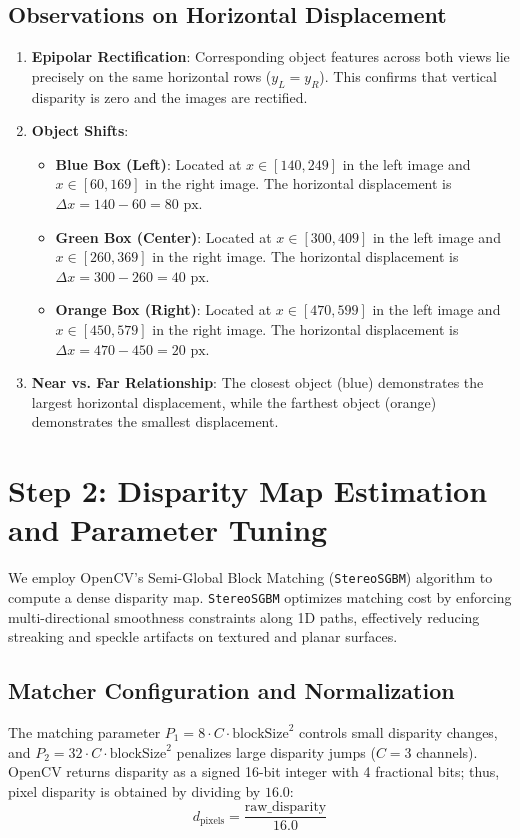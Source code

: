 \documentclass[12pt]{article}
\begin{document}
\subsection{Observations on Horizontal Displacement}
\begin{enumerate}
    \item \textbf{Epipolar Rectification}: Corresponding object features across both views lie precisely on the same horizontal rows ($y_L = y_R$). This confirms that vertical disparity is zero and the images are rectified.
    \item \textbf{Object Shifts}:
    \begin{itemize}
        \item \textbf{Blue Box (Left)}: Located at $x \in [140, 249]$ in the left image and $x \in [60, 169]$ in the right image. The horizontal displacement is $\Delta x = 140 - 60 = 80\text{ px}$.
        \item \textbf{Green Box (Center)}: Located at $x \in [300, 409]$ in the left image and $x \in [260, 369]$ in the right image. The horizontal displacement is $\Delta x = 300 - 260 = 40\text{ px}$.
        \item \textbf{Orange Box (Right)}: Located at $x \in [470, 599]$ in the left image and $x \in [450, 579]$ in the right image. The horizontal displacement is $\Delta x = 470 - 450 = 20\text{ px}$.
    \end{itemize}
    \item \textbf{Near vs. Far Relationship}: The closest object (blue) demonstrates the largest horizontal displacement, while the farthest object (orange) demonstrates the smallest displacement.
\end{enumerate}

\section{Step 2: Disparity Map Estimation and Parameter Tuning}

We employ OpenCV's Semi-Global Block Matching (\texttt{StereoSGBM}) algorithm to compute a dense disparity map. \texttt{StereoSGBM} optimizes matching cost by enforcing multi-directional smoothness constraints along 1D paths, effectively reducing streaking and speckle artifacts on textured and planar surfaces.

\subsection{Matcher Configuration and Normalization}
The matching parameter $P_1 = 8 \cdot C \cdot \text{blockSize}^2$ controls small disparity changes, and $P_2 = 32 \cdot C \cdot \text{blockSize}^2$ penalizes large disparity jumps ($C = 3$ channels). OpenCV returns disparity as a signed 16-bit integer with 4 fractional bits; thus, pixel disparity is obtained by dividing by $16.0$:
\begin{equation}
d_{\text{pixels}} = \frac{\text{raw\_disparity}}{16.0}
\end{equation}
\end{document}
